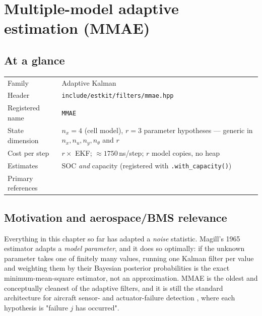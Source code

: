 \chapter{Multiple-model adaptive estimation (MMAE)}
\label{ch:mmae}

\section*{At a glance}
\begin{tabular}{@{}l>{\raggedright\arraybackslash}p{}@{}}
Family & Adaptive Kalman \\
Header & \texttt{include/estkit/filters/mmae.hpp} \\
Registered name & \texttt{MMAE} \\
State dimension & $n_x = 4$ (cell model), $r = 3$ parameter hypotheses --- generic in $n_x,n_u,n_y,n_\theta$ and $r$ \\
Cost per step & $r\times$ EKF; $\approx 1750$\,ns/step; $r$ model copies, no heap \\
Estimates & SOC \emph{and} capacity (registered with \texttt{.with\_capacity()}) \\
Primary references & \cite{magill1965mmae,maybeck1979,hanlon2000mmae,barshalom2001,plett2004ekf3} \\
\end{tabular}

\section{Motivation and aerospace/BMS relevance}
Everything in this chapter so far has adapted a \emph{noise} statistic.  Magill's 1965 estimator
\cite{magill1965mmae} adapts a \emph{model parameter}, and it does so optimally: if the unknown
parameter takes one of finitely many values, running one Kalman filter per value and weighting them
by their Bayesian posterior probabilities is the exact minimum-mean-square estimator, not an
approximation.  MMAE is the oldest and conceptually cleanest of the adaptive filters, and it is
still the standard architecture for aircraft sensor- and actuator-failure detection
\cite{hanlon2000mmae}, where each hypothesis is "failure $j$ has occurred".

